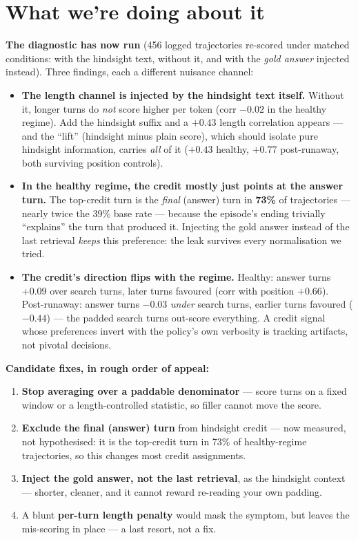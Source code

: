 \documentclass[11pt]{article}
\begin{document}
\section{What we're doing about it}
\textbf{The diagnostic has now run} (456 logged trajectories re-scored under matched conditions:
with the hindsight text, without it, and with the \emph{gold answer} injected instead). Three
findings, each a different nuisance channel:
\begin{itemize}
\item \textbf{The length channel is injected by the hindsight text itself.} Without it, longer
turns do \emph{not} score higher per token (corr $-0.02$ in the healthy regime). Add the hindsight
suffix and a $+0.43$ length correlation appears --- and the ``lift'' (hindsight minus plain score),
which should isolate pure hindsight information, carries \emph{all} of it ($+0.43$ healthy,
$+0.77$ post-runaway, both surviving position controls).
\item \textbf{In the healthy regime, the credit mostly just points at the answer turn.} The
top-credit turn is the \emph{final} (answer) turn in \textbf{73\%} of trajectories --- nearly twice
the 39\% base rate --- because the episode's ending trivially ``explains'' the turn that produced
it. Injecting the gold answer instead of the last retrieval \emph{keeps} this preference: the leak
survives every normalisation we tried.
\item \textbf{The credit's direction flips with the regime.} Healthy: answer turns +0.09 over
search turns, later turns favoured (corr with position $+0.66$). Post-runaway: answer turns
$-0.03$ \emph{under} search turns, earlier turns favoured ($-0.44$) --- the padded search turns
out-score everything. A credit signal whose preferences invert with the policy's own verbosity is
tracking artifacts, not pivotal decisions.
\end{itemize}

\textbf{Candidate fixes, in rough order of appeal:}
\begin{enumerate}
\item \textbf{Stop averaging over a paddable denominator} --- score turns on a fixed window or a
length-controlled statistic, so filler cannot move the score.
\item \textbf{Exclude the final (answer) turn} from hindsight credit --- now measured, not
hypothesised: it is the top-credit turn in 73\% of healthy-regime trajectories, so this changes
most credit assignments.
\item \textbf{Inject the gold answer, not the last retrieval}, as the hindsight context --- shorter,
cleaner, and it cannot reward re-reading your own padding.
\item A blunt \textbf{per-turn length penalty} would mask the symptom, but leaves the mis-scoring in
place --- a last resort, not a fix.
\end{enumerate}
\end{document}
